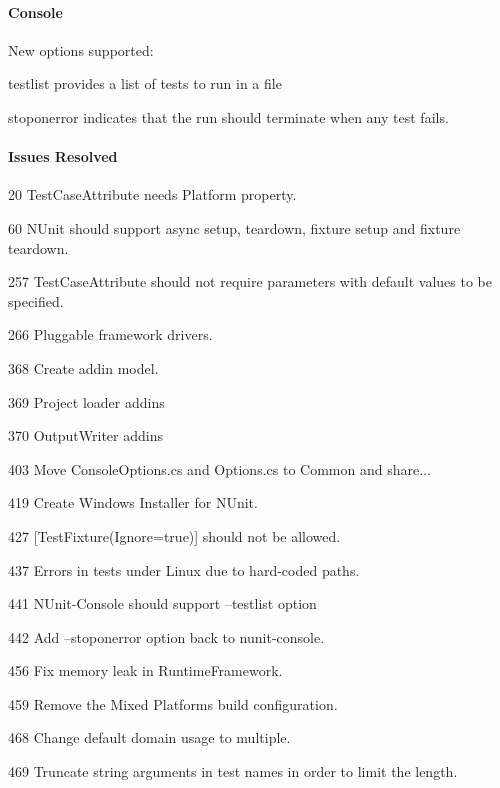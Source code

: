 \paragraph*{Console}


\begin{DoxyItemize}
\item New options supported\+:
\begin{DoxyItemize}
\item testlist provides a list of tests to run in a file
\item stoponerror indicates that the run should terminate when any test fails.
\end{DoxyItemize}
\end{DoxyItemize}

\paragraph*{Issues Resolved}


\begin{DoxyItemize}
\item 20 Test\+Case\+Attribute needs Platform property.
\item 60 N\+Unit should support async setup, teardown, fixture setup and fixture teardown.
\item 257 Test\+Case\+Attribute should not require parameters with default values to be specified.
\item 266 Pluggable framework drivers.
\item 368 Create addin model.
\item 369 Project loader addins
\item 370 Output\+Writer addins
\item 403 Move Console\+Options.\+cs and Options.\+cs to Common and share...
\item 419 Create Windows Installer for N\+Unit.
\item 427 \mbox{[}Test\+Fixture(Ignore=true)\mbox{]} should not be allowed.
\item 437 Errors in tests under Linux due to hard-\/coded paths.
\item 441 N\+Unit-\/\+Console should support --testlist option
\item 442 Add --stoponerror option back to nunit-\/console.
\item 456 Fix memory leak in Runtime\+Framework.
\item 459 Remove the Mixed Platforms build configuration.
\item 468 Change default domain usage to multiple.
\item 469 Truncate string arguments in test names in order to limit the length.
\end{DoxyItemize}

